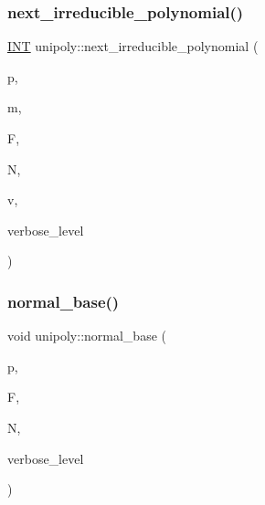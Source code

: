 \subsubsection{\texorpdfstring{next\+\_\+irreducible\+\_\+polynomial()}{next\_irreducible\_polynomial()}}
{\footnotesize\ttfamily \mbox{\hyperlink{galois_8h_a09fddde158a3a20bd2dcadb609de11dc}{I\+NT}} unipoly\+::next\+\_\+irreducible\+\_\+polynomial (\begin{DoxyParamCaption}\item[{\mbox{\hyperlink{galois_8h_a09fddde158a3a20bd2dcadb609de11dc}{I\+NT}}}]{p,  }\item[{\mbox{\hyperlink{classunipoly}{unipoly}} \&}]{m,  }\item[{\mbox{\hyperlink{classmatrix}{matrix}} \&}]{F,  }\item[{\mbox{\hyperlink{classmatrix}{matrix}} \&}]{N,  }\item[{\mbox{\hyperlink{class_vector}{Vector}} \&}]{v,  }\item[{\mbox{\hyperlink{galois_8h_a09fddde158a3a20bd2dcadb609de11dc}{I\+NT}}}]{verbose\+\_\+level }\end{DoxyParamCaption})}

\mbox{\label{classunipoly_a38f30f53df7f4ff1506f2b41666ff39e}} 
\subsubsection{\texorpdfstring{normal\+\_\+base()}{normal\_base()}}
{\footnotesize\ttfamily void unipoly\+::normal\+\_\+base (\begin{DoxyParamCaption}\item[{\mbox{\hyperlink{galois_8h_a09fddde158a3a20bd2dcadb609de11dc}{I\+NT}}}]{p,  }\item[{\mbox{\hyperlink{classmatrix}{matrix}} \&}]{F,  }\item[{\mbox{\hyperlink{classmatrix}{matrix}} \&}]{N,  }\item[{\mbox{\hyperlink{galois_8h_a09fddde158a3a20bd2dcadb609de11dc}{I\+NT}}}]{verbose\+\_\+level }\end{DoxyParamCaption})}

\mbox{\label{classunipoly_a1fdf6f2da235edcf45fca433dea19370}} 
